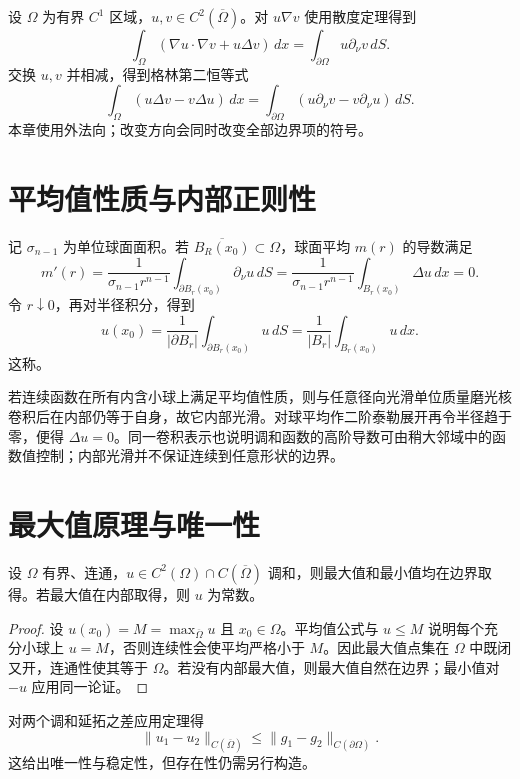 \documentclass[UTF8,12pt,a4paper,fontset=fandol]{ctexbook}
\begin{document}
设 $\Omega$ 为有界 $C^1$ 区域，$u,v\in C^2(\overline\Omega)$。对 $u\nabla v$ 使用散度定理得到
\begin{equation}
 \int_\Omega(\nabla u\cdot\nabla v+u\Delta v)\,dx
 =\int_{\partial\Omega}u\partial_\nu v\,dS.
 \label{eq:green-first}
\end{equation}
交换 $u,v$ 并相减，得到格林第二恒等式
\begin{equation}
 \int_\Omega(u\Delta v-v\Delta u)\,dx
 =\int_{\partial\Omega}(u\partial_\nu v-v\partial_\nu u)\,dS.
 \label{eq:green-second}
\end{equation}
本章使用外法向；改变方向会同时改变全部边界项的符号。

\section{平均值性质与内部正则性}
记 $\sigma_{n-1}$ 为单位球面面积。若 $\overline{B_R(x_0)}\subset\Omega$，球面平均 $m(r)$ 的导数满足
\[
 m'(r)=\frac1{\sigma_{n-1}r^{n-1}}\int_{\partial B_r(x_0)}\partial_\nu u\,dS
 =\frac1{\sigma_{n-1}r^{n-1}}\int_{B_r(x_0)}\Delta u\,dx=0.
\]
令 $r\downarrow0$，再对半径积分，得到
\begin{equation}
 u(x_0)=\frac1{|\partial B_r|}\int_{\partial B_r(x_0)}u\,dS
       =\frac1{|B_r|}\int_{B_r(x_0)}u\,dx.
 \label{eq:harmonic-mean}
\end{equation}
这称。

若连续函数在所有内含小球上满足平均值性质，则与任意径向光滑单位质量磨光核卷积后在内部仍等于自身，故它内部光滑。对球平均作二阶泰勒展开再令半径趋于零，便得 $\Delta u=0$。同一卷积表示也说明调和函数的高阶导数可由稍大邻域中的函数值控制；内部光滑并不保证连续到任意形状的边界。

\section{最大值原理与唯一性}
\begin{theorem}
设 $\Omega$ 有界、连通，$u\in C^2(\Omega)\cap C(\overline\Omega)$ 调和，则最大值和最小值均在边界取得。若最大值在内部取得，则 $u$ 为常数。
\end{theorem}
\begin{proof}
设 $u(x_0)=M=\max_{\overline\Omega}u$ 且 $x_0\in\Omega$。平均值公式与 $u\le M$ 说明每个充分小球上 $u=M$，否则连续性会使平均严格小于 $M$。因此最大值点集在 $\Omega$ 中既闭又开，连通性使其等于 $\Omega$。若没有内部最大值，则最大值自然在边界；最小值对 $-u$ 应用同一论证。
\end{proof}
对两个调和延拓之差应用定理得
\[
 \|u_1-u_2\|_{C(\overline\Omega)}\le\|g_1-g_2\|_{C(\partial\Omega)}.
\]
这给出唯一性与稳定性，但存在性仍需另行构造。
\end{document}

